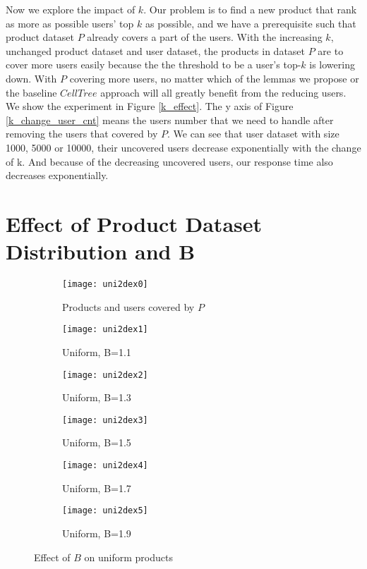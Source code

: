 Now we explore the impact of $k$. Our problem is to find a new product that rank as more as possible 
users' top $k$ as possible, and we have a prerequisite such that product dataset $P$ already 
covers a part of the users. With the increasing $k$, unchanged product dataset and 
user dataset, the products in dataset $P$ are to cover more users easily because the 
the threshold to be a user's top-$k$ is lowering down. With $P$ covering more users, no matter 
which of the lemmas
we propose or the baseline $CellTree$ approach will all greatly benefit from the reducing 
users. We show the experiment in Figure \ref{k_effect}. The y axis of Figure 
\ref{k_change_user_cnt} means the users number that we need to handle after removing 
the users that covered by $P$. We can see that user dataset with size 1000, 5000 or 10000, their 
uncovered users decrease exponentially with the change of k. And because of the decreasing
uncovered users, our response time also decreases exponentially.

\section{Effect of Product Dataset Distribution and B}

\begin{figure}[ht!]
  \centering
  \begin{subfigure}[b]{0.45\linewidth}
    \texttt{[image: uni2dex0]}
    \caption{Products and users covered by $P$}
    \label{cover_uni}
  \end{subfigure}
  \begin{subfigure}[b]{0.45\linewidth}
    \texttt{[image: uni2dex1]}
    \caption{Uniform, B=1.1}
    \label{it_uni_1_1}
  \end{subfigure}
  \begin{subfigure}[b]{0.45\linewidth}
    \texttt{[image: uni2dex2]}
    \caption{Uniform, B=1.3}
    \label{it_uni_1_3}
  \end{subfigure}
  \begin{subfigure}[b]{0.45\linewidth}
    \texttt{[image: uni2dex3]}
    \caption{Uniform, B=1.5}
    \label{it_uni_1_5}
  \end{subfigure}
  \begin{subfigure}[b]{0.45\linewidth}
    \texttt{[image: uni2dex4]}
    \caption{Uniform, B=1.7}
    \label{it_uni_1_7}
  \end{subfigure}
  \begin{subfigure}[b]{0.45\linewidth}
    \texttt{[image: uni2dex5]}
    \caption{Uniform, B=1.9}
    \label{it_uni_1_9}
  \end{subfigure}
  \caption{Effect of $B$ on uniform products}
  \label{uni_2d_demo}
\end{figure}



